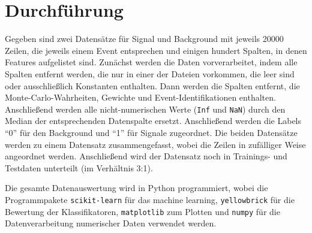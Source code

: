 \section{Durchführung}
\label{sec:Durchführung}

Gegeben sind zwei Datensätze für Signal und Background mit jeweils 20000 Zeilen, die jeweils einem Event entsprechen und einigen hundert Spalten, in denen Features aufgelistet sind. Zunächst werden die Daten vorverarbeitet, indem alle Spalten entfernt werden, die nur in einer der Dateien vorkommen, die leer sind oder ausschließlich Konstanten enthalten. Dann werden die Spalten entfernt, die Monte-Carlo-Wahrheiten, Gewichte und Event-Identifikationen enthalten. Anschließend werden alle nicht-numerischen Werte (\texttt{Inf} und \texttt{NaN}) durch den Median der entsprechenden Datenspalte ersetzt. Anschließend werden die Labels \enquote{0} für den Background und \enquote{1} für Signale zugeordnet. Die beiden Datensätze werden zu einem Datensatz zusammengefasst, wobei die Zeilen in zufälliger Weise angeordnet werden. Anschließend wird der Datensatz noch in Trainings- und Testdaten unterteilt (im Verhältnis 3:1).

Die gesamte Datenauswertung wird in Python programmiert, wobei die Programmpakete \texttt{scikit-learn} \cite{scikit} für das machine learning, \texttt{yellowbrick} \cite{yellowbrick} für die Bewertung der Klassifikatoren, \texttt{matplotlib} \cite{matplotlib} zum Plotten und \texttt{numpy} \cite{numpy} für die Datenverarbeitung numerischer Daten verwendet werden.
